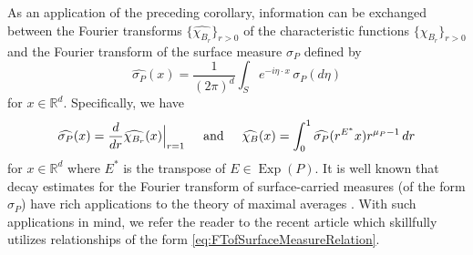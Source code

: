 \documentclass[smallextended]{svjour3}
\theoremstyle{remark}
\newcommand\Exp{\operatorname{Exp}}
\begin{document}
\noindent As an application of the preceding corollary, information can be exchanged between the Fourier transforms $\{\widehat{\chi_{B_r}}\}_{r>0}$ of the characteristic functions $\{\chi_{B_r}\}_{r>0}$ and the Fourier transform of the surface measure $\sigma_P$ defined by
\begin{equation*}
\widehat{\sigma_P}(x)=\frac{1}{(2\pi)^d}\int_{S} e^{-i\eta\cdot x}\,\sigma_P(d\eta)
\end{equation*}
for $x\in\mathbb{R}^d$. Specifically, we have
\begin{equation}\label{eq:FTofSurfaceMeasureRelation}
\widehat{\sigma_P}(x)=\frac{d}{dr}\widehat{\chi_{B_r}}(x)\Big\vert_{r=1}\hspace{0.5cm}\mbox{and}\hspace{0.5cm}\widehat{\chi_B}(x)=\int_0^1\widehat{\sigma_P}(r^{E^*}x)r^{\mu_P-1}\,dr
\end{equation}
for $x\in\mathbb{R}^d$ where $E^*$ is the transpose of $E\in\Exp(P)$. It is well known that decay estimates for the Fourier transform of surface-carried measures (of the form $\sigma_P$) have rich applications to the theory of maximal averages \cite{stein_harmonic_1993}.  With such applications in mind, we refer the reader to the recent article \cite{greenblatt_fourier_2021} which skillfully utilizes relationships of the form \eqref{eq:FTofSurfaceMeasureRelation}.
\end{document}
